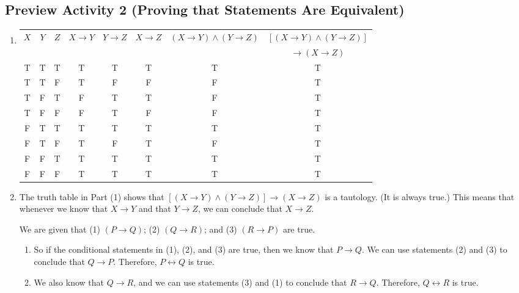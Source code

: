 \subsection*{Preview Activity 2 (Proving that Statements Are Equivalent)}
\begin{enumerate}
\item 
\begin{tabular}[t]{| c | c | c || c | c | c | c | c | } \hline
$X$ & $Y$ & $Z$ &  $X \to Y$ & $Y \to Z$ & $X \to Z$ & $\left( {X \to Y} \right) \wedge \left( {Y \to Z} \right )$ & $\left[ {\left( {X \to Y} \right) \wedge \left( {Y \to Z} \right )} \right]$ \\ 
 & & & & & & & $\to \left( {X \to Z} \right)$ \\ \hline
T & T & T & T & T & T & T & T \\ \hline
T & T & F & T & F & F & F & T \\ \hline
T & F & T & F & T & T & F & T \\ \hline
T & F & F & F & T & F & F & T \\ \hline
F & T & T & T & T & T & T & T \\ \hline
F & T & F & T & F & T & F & T \\ \hline
F & F & T & T & T & T & T & T \\ \hline
F & F & F & T & T & T & T & T \\ \hline
\end{tabular}



\item The truth table in Part (1) shows that   
$\left[ {\left( {X \to Y} \right) \wedge \left( {Y \to Z} \right)} \right] \to \left( {X \to Z} \right)$  is a tautology.  (It is always true.)  This means that whenever we know that  $X \to Y$
  and that  $Y \to Z$, we can conclude that  $X \to Z$.

We are given that (1) $\left( {P \to Q} \right)$; (2) $\left( {Q \to R} \right)$; and  
(3) $\left( {R \to P} \right)$ are true.

\begin{enumerate}
\item So if the conditional statements in (1), (2), and (3) are true, then we know that  
$P \to Q$. We can use statements (2) and (3) to conclude that  $Q \to P$.  Therefore,  
$P \leftrightarrow Q$  is true.

\item We also know that  $Q \to R$, and we can use statements (3) and (1) to conclude that  
$R \to Q$.  Therefore,  $Q \leftrightarrow R$  is true.


\end{enumerate}
\end{enumerate}
